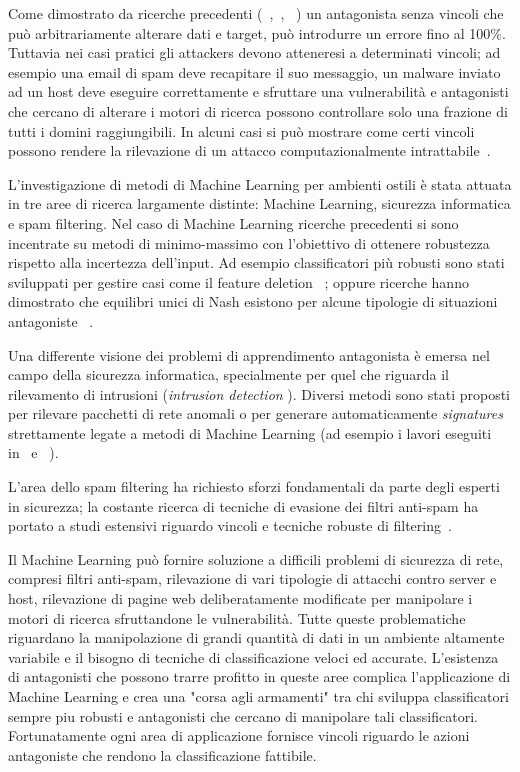 Come dimostrato da ricerche precedenti (~\cite{kearnsli},~\cite{Auer2002},~\cite{paclearning} ) un antagonista senza vincoli che può arbitrariamente alterare dati e target, può introdurre un errore fino al 100\%. Tuttavia nei casi pratici gli attackers devono atteneresi a determinati vincoli; ad esempio una email di spam deve recapitare il suo messaggio, un malware inviato ad un host deve eseguire correttamente e sfruttare una vulnerabilità e antagonisti che cercano di alterare i motori di ricerca possono controllare solo una frazione di tutti i domini raggiungibili. In alcuni casi si può mostrare come certi vincoli possono rendere la rilevazione di un attacco computazionalmente intrattabile~\cite{fogla}.

L'investigazione di metodi di Machine Learning per ambienti ostili è stata attuata in tre aree di ricerca largamente distinte: Machine Learning, sicurezza informatica e spam filtering. Nel caso di Machine Learning ricerche precedenti si sono incentrate su metodi di minimo-massimo con l'obiettivo di ottenere robustezza rispetto alla incertezza dell'input. Ad esempio classificatori più robusti sono stati sviluppati per gestire casi come il feature deletion~\cite{globerson} ; oppure ricerche hanno dimostrato che equilibri unici di Nash esistono per alcune tipologie di situazioni antagoniste~\cite{nash} .

Una differente visione dei problemi di apprendimento antagonista è emersa nel campo della sicurezza informatica, specialmente per quel che riguarda il rilevamento di intrusioni (\textit{intrusion detection} ). Diversi metodi sono stati proposti per rilevare pacchetti di rete anomali o per generare automaticamente \textit{signatures} strettamente legate a metodi di Machine Learning (ad esempio i lavori eseguiti in~\cite{wangstolfo} e~\cite{wang2006} ).

L'area dello spam filtering ha richiesto sforzi fondamentali da parte degli esperti in sicurezza; la costante ricerca di tecniche di evasione dei filtri anti-spam ha portato a studi estensivi riguardo vincoli e tecniche robuste di filtering~\cite{dalvi}. 

Il Machine Learning può fornire soluzione a difficili problemi di sicurezza di rete, compresi filtri anti-spam, rilevazione di vari tipologie di attacchi contro server e host, rilevazione di pagine web deliberatamente modificate per manipolare i motori di ricerca sfruttandone le vulnerabilità. Tutte queste problematiche riguardano la manipolazione di grandi quantità di dati in un ambiente altamente variabile e il bisogno di tecniche di classificazione veloci ed accurate. L'esistenza di antagonisti che possono trarre profitto in queste aree complica l'applicazione di Machine Learning e crea una "corsa agli armamenti" tra chi sviluppa classificatori sempre piu robusti e antagonisti che cercano di manipolare tali classificatori. Fortunatamente ogni area di applicazione fornisce vincoli riguardo le azioni antagoniste che rendono la classificazione fattibile. 

